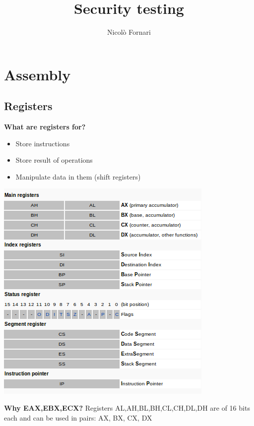 \documentclass[10pt,a4paper]{book}
\author{Nicolò Fornari}
\title{Security testing}
\begin{document}
\chapter{Assembly}
\section{Registers}
\textbf{What are registers for?}
\begin{itemize}[noitemsep,nolistsep]
\item Store instructions
\item Store result of operations
\item Manipulate data in them (shift registers)
\end{itemize}

\includegraphics[scale=0.6]{registers.png}

\textbf{Why EAX,EBX,ECX?}
Registers AL,AH,BL,BH,CL,CH,DL,DH are of 16 bits each and can be used in pairs: AX, BX, CX, DX
\newpage
\end{document}
